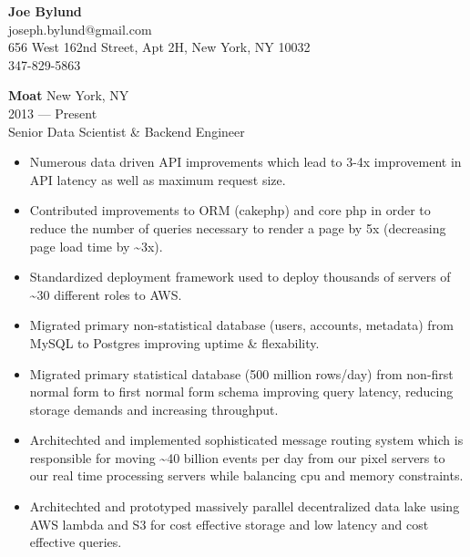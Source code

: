 
\begin{center}
\myfontsize{\bigheader}
\textbf{Joe Bylund}\\
\myfontsize{\bodysize}
joseph.bylund@gmail.com\\
656 West 162nd Street, Apt 2H, New York, NY 10032\\
347-829-5863\hspace{3ex}\\
\end{center}

\hrulefill
\vspace{\littleskip}



\myfontsize{\bigheader}
\textbf{Moat}
\myfontsize{\bodysize}
New York, NY\\
2013 --- Present\\
Senior Data Scientist \& Backend Engineer\\

\begin{itemize}[topsep=1ex, partopsep=0ex, parsep=0ex, itemsep=0.5ex]
    \item Numerous data driven API improvements which lead to 3-4x improvement in API latency as well as maximum request size.
    \item Contributed improvements to ORM (cakephp) and core php in order to reduce the number of queries necessary to render a page by 5x (decreasing page load time by \textasciitilde{}3x).
    \item Standardized deployment framework used to deploy thousands of servers of \textasciitilde{}30 different roles to AWS.
    \item Migrated primary non-statistical database (users, accounts, metadata) from MySQL to Postgres improving uptime \& flexability.
    \item Migrated primary statistical database (500 million rows/day) from non-first normal form to first normal form schema improving query latency, reducing storage demands and increasing throughput.
    \item Architechted and implemented sophisticated message routing system which is responsible for moving \textasciitilde{}40 billion events per day from our pixel servers to our real time processing servers while balancing cpu and memory constraints.
    \item Architechted and prototyped massively parallel decentralized data lake using AWS lambda and S3 for cost effective storage and low latency and cost effective queries.
\end{itemize}

